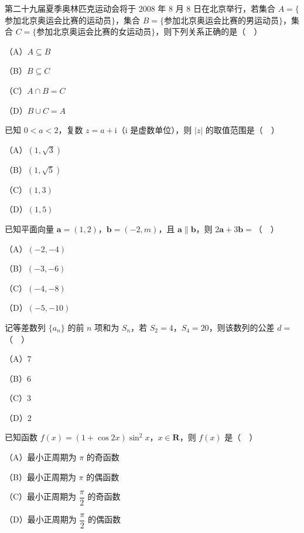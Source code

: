 


\begin{question}
第二十九届夏季奥林匹克运动会将于 $2008$ 年 $8$ 月 $8$ 日在北京举行，若集合 $A=\{$参加北京奥运会比赛的运动员$\}$，集合 $B=\{$参加北京奥运会比赛的男运动员$\}$，集合 $C=\{$参加北京奥运会比赛的女运动员$\}$，则下列关系正确的是（　）

（A）$A\subseteq B$

（B）$B\subseteq C$

（C）$A\cap B=C$

（D）$B\cup C=A$

\end{question}
\begin{question}
已知 $0<a<2$，复数 $z=a+\mathrm i$（$\mathrm i$ 是虚数单位），则 $|z|$ 的取值范围是（　）

（A）$(1,\sqrt3)$

（B）$(1,\sqrt5)$

（C）$(1,3)$

（D）$(1,5)$

\end{question}
\begin{question}
已知平面向量 $\boldsymbol a=(1,2)$，$\boldsymbol b=(-2,m)$，且 $\boldsymbol a\parallel\boldsymbol b$，则 $2\boldsymbol a+3\boldsymbol b=$（　）

（A）$(-2,-4)$

（B）$(-3,-6)$

（C）$(-4,-8)$

（D）$(-5,-10)$

\end{question}
\begin{question}
记等差数列 $\{a_n\}$ 的前 $n$ 项和为 $S_n$，若 $S_2=4$，$S_4=20$，则该数列的公差 $d=$（　）

（A）$7$

（B）$6$

（C）$3$

（D）$2$

\end{question}
\begin{question}
已知函数 $f(x)=(1+\cos2x)\sin^2x$，$x\in\mathbf R$，则 $f(x)$ 是（　）

（A）最小正周期为 $\pi$ 的奇函数

（B）最小正周期为 $\pi$ 的偶函数

（C）最小正周期为 $\dfrac{\pi}{2}$ 的奇函数

（D）最小正周期为 $\dfrac{\pi}{2}$ 的偶函数

\end{question}
